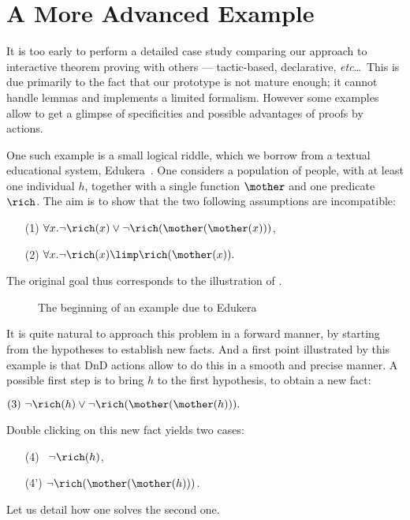 

\section{A More Advanced Example}

It is too early to perform a detailed case study comparing our approach
to interactive theorem proving with others --- tactic-based,
declarative, {\em etc}\dots~This is due primarily to the fact that
our prototype is not mature enough; it cannot handle lemmas and
implements a limited formalism. However some examples allow to get a
glimpse of specificities and possible advantages of proofs by actions.

One such example is a small logical riddle, which we borrow from a
textual educational system, Edukera~\cite{edukera}. One considers a
population of people, with at least one individual $h$, together with a
single function $\mother$ and one predicate $\rich$. The aim is to
show that the two following assumptions are incompatible:
\begin{itemize}
\item[(1)] $\forall x. \neg\rich(x)\lor \neg\rich(\mother(\mother(x)))$,
\item[(2)] $\forall x. \neg\rich(x) \limp \rich(\mother(x)).$
\end{itemize}
The original goal thus corresponds to the illustration of .

\begin{figure*}
  \caption{The beginning of an example due to Edukera}
\end{figure*}

It is quite natural to approach this problem in a forward manner, by starting
from the hypotheses to establish new facts. And a first point illustrated by
this example is that DnD actions allow to do this in a smooth and precise
manner. A possible first step is to bring $h$ to the first hypothesis, to obtain
a new fact:

\medskip
$(3) ~\neg\rich(h)\lor \neg\rich(\mother(\mother(h))).$
\medskip

\noindent Double clicking on this new fact yields two cases:
\begin{itemize}
 \item[(4)~] $ \neg\rich(h)$,
 \item[(4')] $ \neg\rich(\mother(\mother(h)))$.
 \end{itemize}
Let us detail how one solves the
second one.

